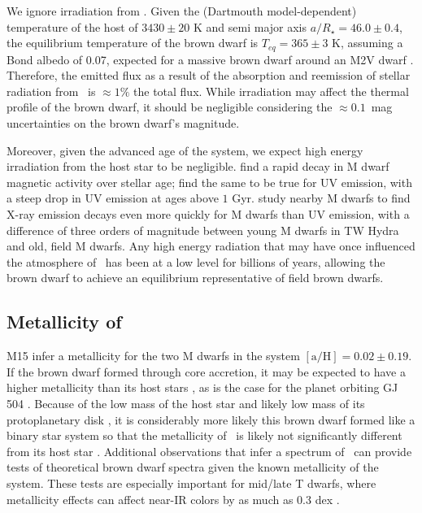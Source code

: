 We ignore irradiation from \LA.
Given the (Dartmouth model-dependent) temperature of the host of $3430 \pm 20$ K 
and semi major axis $a/R_\star = 46.0 \pm 0.4$, the equilibrium temperature
of the brown dwarf is $T_{eq} = 365\pm 3$ K, assuming a Bond albedo of 0.07, expected for 
a massive brown dwarf around an M2V dwarf \citep{Marley99}.
Therefore, the emitted flux as a result of the absorption and reemission of stellar 
radiation from \LA\ is $\approx 1\%$ the total flux. 
While irradiation may affect the thermal profile of the brown dwarf, it should
be negligible considering the $\approx 0.1$~mag uncertainties on the brown dwarf's 
magnitude.

Moreover, given the advanced age of the system, we expect high energy 
irradiation from the host star to be negligible. \citet{West08} find a rapid decay
in M dwarf magnetic activity over stellar age; \citet{Shkolnik14}
find the same to be true for UV emission, with a steep drop in UV emission at ages
above $1$ Gyr.
\citet{Stelzer13} study nearby M dwarfs to find X-ray emission decays even more quickly
for M dwarfs than UV emission, with a difference of three orders of magnitude between 
young M dwarfs in TW Hydra and old, field M dwarfs.
Any high energy radiation that may have once influenced the atmosphere of \LC\ has 
been at a low level for billions of years, allowing the brown dwarf to 
achieve an equilibrium representative of field brown dwarfs.

\subsection{Metallicity of \LC}

M15 infer a metallicity for the two M dwarfs in the system 
$[\textrm{a/H}] = 0.02 \pm 0.19$.
If the brown dwarf formed through core accretion, it may be expected to have
a higher metallicity than its host stars \citep{Pollack86, Podolak88},
as is the case for the planet orbiting GJ\,504 \citep{Skemer15}. 
Because of the low mass of the host star and likely low mass of its protoplanetary disk
\citep{Andrews13}, it is considerably more likely this brown dwarf formed like a binary
star system so that the metallicity of \LC\ is likely not significantly different from its
host star \citep{Desidera04}.
Additional observations that infer a spectrum of \LC\ can provide 
tests of theoretical brown dwarf spectra given the known metallicity of the system.
These tests are especially important for mid/late T dwarfs, where metallicity effects
can affect near-IR colors by as much as 0.3 dex \citep{Burningham13}.



